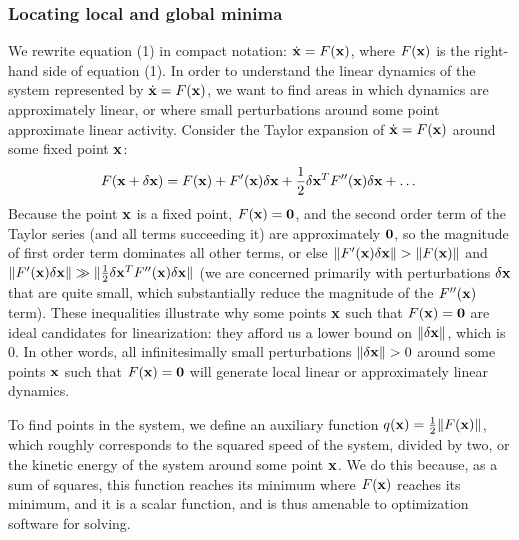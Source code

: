 \documentclass[12pt,a4paper,final]{iopart}
\begin{document}
\subsubsection{Locating local and global minima}
We rewrite equation (1) in compact notation: $\dot{\bf{x}} = F(\bf{x})$, where $F(\bf{x})$ is the right-hand side of equation (1). In order to understand the linear dynamics of the system represented by $\dot{\bf{x}} = F(\bf{x})$, we want to find areas in which dynamics are approximately linear, or where small perturbations around some point approximate linear activity. Consider the Taylor expansion of $\dot{\bf{x}} = F(\bf{x})$ around some fixed point $\bf{x}$:
\[
    F({\bf x} + \delta {\bf x}) = F({\bf x}) + F'({\bf x})\delta {\bf x} + \frac{1}{2} \delta {\bf x}^T F''({\bf x}) \delta {\bf x} + \dots
\]
Because the point $\bf{x}$ is a fixed point, $F({\bf x}) = {\bf 0}$, and the second order term of the Taylor series (and all terms succeeding it) are approximately ${\bf 0}$, so the magnitude of first order term dominates all other terms, or else $\lVert F'({\bf x})\delta {\bf x} \rVert > \lVert F({\bf x}) \rVert$ and $\lVert F'({\bf x})\delta {\bf x} \rVert \gg \lVert \frac{1}{2} \delta {\bf x}^T F''({\bf x}) \delta {\bf x} \rVert$ (we are concerned primarily with perturbations $\delta {\bf x}$ that are quite small, which substantially reduce the magnitude of the $F''({\bf x})$ term). These inequalities illustrate why some points ${\bf x}$ such that $F({\bf x}) = {\bf 0}$ are ideal candidates for linearization: they afford us a lower bound on $\lVert \delta {\bf x} \rVert$, which is 0. In other words, all infinitesimally small perturbations $\lVert \delta {\bf x} \rVert > 0 $ around some points ${\bf x}$ such that $F({\bf x}) = {\bf 0}$ will generate local linear or approximately linear dynamics.

To find points in the system, we define an auxiliary function $q({\bf x}) = \frac{1}{2} \lVert F({\bf x}) \rVert$, which roughly corresponds to the squared speed of the system, divided by two, or the kinetic energy of the system around some point ${\bf x}$. We do this because, as a sum of squares, this function reaches its minimum where $F({\bf x})$ reaches its minimum, and it is a scalar function, and is thus amenable to optimization software for solving.
\end{document}
